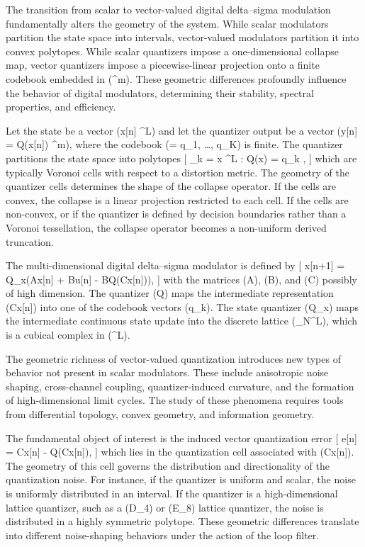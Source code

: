 \noindent
The transition from scalar to vector-valued digital delta--sigma modulation fundamentally alters the geometry of the system. While scalar modulators partition the state space into intervals, vector-valued modulators partition it into convex polytopes. While scalar quantizers impose a one-dimensional collapse map, vector quantizers impose a piecewise-linear projection onto a finite codebook embedded in (^m). These geometric differences profoundly influence the behavior of digital modulators, determining their stability, spectral properties, and efficiency.

Let the state be a vector (x[n] \in {}^L) and let the quantizer output be a vector (y[n] = Q(x[n]) \in \Lambda \subset {}^m), where the codebook (\Lambda = {q_1, \dots, q_K}) is finite. The quantizer partitions the state space into polytopes
[
\Omega_k = { x \in {}^L : Q(x) = q_k },
]
which are typically Voronoi cells with respect to a distortion metric. The geometry of the quantizer cells determines the shape of the collapse operator. If the cells are convex, the collapse is a linear projection restricted to each cell. If the cells are non-convex, or if the quantizer is defined by decision boundaries rather than a Voronoi tessellation, the collapse operator becomes a non-uniform derived truncation.

The multi-dimensional digital delta--sigma modulator is defined by
[
x[n+1] = Q_x(Ax[n] + Bu[n] - BQ(Cx[n])),
]
with the matrices (A), (B), and (C) possibly of high dimension. The quantizer (Q) maps the intermediate representation (Cx[n]) into one of the codebook vectors (q_k). The state quantizer (Q_x) maps the intermediate continuous state update into the discrete lattice (_N^L), which is a cubical complex in (^L).

The geometric richness of vector-valued quantization introduces new types of behavior not present in scalar modulators. These include anisotropic noise shaping, cross-channel coupling, quantizer-induced curvature, and the formation of high-dimensional limit cycles. The study of these phenomena requires tools from differential topology, convex geometry, and information geometry.

The fundamental object of interest is the induced vector quantization error
[
e[n] = Cx[n] - Q(Cx[n]),
]
which lies in the quantization cell associated with (Cx[n]). The geometry of this cell governs the distribution and directionality of the quantization noise. For instance, if the quantizer is uniform and scalar, the noise is uniformly distributed in an interval. If the quantizer is a high-dimensional lattice quantizer, such as a (D_4) or (E_8) lattice quantizer, the noise is distributed in a highly symmetric polytope. These geometric differences translate into different noise-shaping behaviors under the action of the loop filter.

